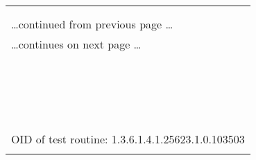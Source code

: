 \documentclass{article}
\begin{document}
\begin{longtable}{|p{}|}
\hline
\rowcolor{openvas_warning}{\color{white}{Medium (CVSS: 3.5) }}\\
\rowcolor{openvas_warning}{\color{white}{NVT: openssh-server Forced Command Handling Information Disclosure Vulnerability}}\\
\hline
\endfirsthead
\hfill\ldots continued from previous page \ldots \\
\hline
\endhead
\hline
\ldots continues on next page \ldots \\
\endfoot
\hline
\endlastfoot
\\
\rowcolor{white}{\verb=According to its banner, the version of OpenSSH installed on the remote=}\\
\rowcolor{white}{\verb=host is older than 5.7:=}\\
\rowcolor{white}{\verb= ssh-2.0-openssh_5.6=}\\
\rowcolor{white}{\verb= Summary:=}\\
\rowcolor{white}{\verb= The auth_parse_options function in auth-options.c in sshd in OpenSSH before 5.7=}\\
\rowcolor{white}{\verb=provides debug messages containing authorized_keys command options, which allows=}\\
\rowcolor{white}{\verb=remote authenticated users to obtain potentially sensitive information by=}\\
\rowcolor{white}{\verb=reading these messages, as demonstrated by the shared user account required by=}\\
\rowcolor{white}{\verb=Gitolite. NOTE: this can cross privilege boundaries because a user account may=}\\
\rowcolor{white}{\verb=intentionally have no shell or filesystem access, and therefore may have no=}\\
\rowcolor{white}{\verb=supported way to read an authorized_keys file in its own home directory.=}\\
\rowcolor{white}{\verb=OpenSSH before 5.7 is affected;=}\\
\rowcolor{white}{\verb= Solution:=}\\
\rowcolor{white}{\verb= Updates are available. Please see the references for more information.=}\\
\rowcolor{white}{\verb==}\\
\rowcolor{white}{\verb==}\\
\\
OID of test routine: 1.3.6.1.4.1.25623.1.0.103503\\
\\


\end{longtable}
\end{document}

